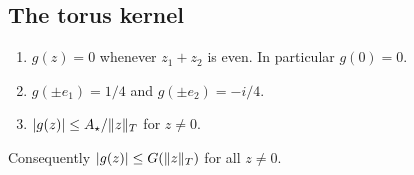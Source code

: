 \subsection{The torus kernel}

\begin{lemma}\label{lem:torus}
\begin{enumerate}[label=(\alph*)]
\item $g(z)=0$ whenever $z_1+z_2$ is even. In particular $g(0)=0$.
\item $g(\pm e_1)=1/4$ and $g(\pm e_2)=-i/4$.
\item $\lvert g(z)\rvert\le A_\star/\lVert z\rVert_T$ for $z\ne0$.
\end{enumerate}
Consequently $\lvert g(z)\rvert\le G(\lVert z\rVert_T)$ for all $z\ne0$.
\end{lemma}


